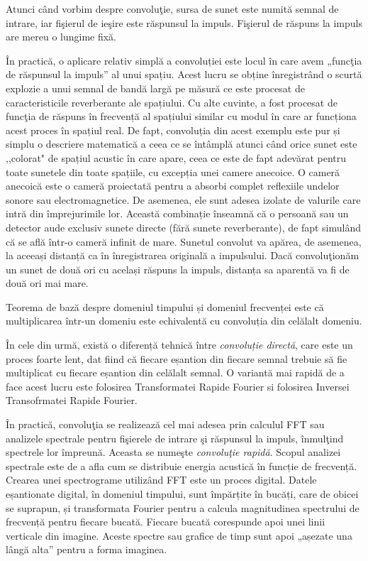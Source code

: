 	
	Atunci c\^{a}nd vorbim despre convolu\c{t}ie, sursa de sunet este numit\u{a} semnal de intrare, iar fi\c{s}ierul de ie\c{s}ire este r\u{a}spunsul la impuls. Fi\c{s}ierul de r\u{a}spuns la impuls are mereu o lungime fix\u{a}.
	 
	
	În practică, o aplicare relativ simplă a convoluției este locul în care avem „func\c{t}ia de răspunsul la impuls” al unui spațiu. Acest lucru se obține înregistrând o scurtă explozie a unui semnal de bandă largă pe măsură ce este procesat de caracteristicile reverberante ale spațiului. Cu alte cuvinte, a fost procesat de func\c{t}ia de răspuns în frecvență al spațiului similar cu modul în care ar funcționa acest proces în spațiul real. De fapt, convoluția din acest exemplu este pur și simplu o descriere matematică a ceea ce se întâmplă atunci când orice sunet este ,,colorat" de spațiul acustic în care apare, ceea ce este de fapt adevărat pentru toate sunetele din toate spațiile, cu excepția unei camere anecoice. O cameră anecoică este o cameră proiectată pentru a absorbi complet reflexiile undelor sonore sau electromagnetice. De asemenea, ele sunt adesea izolate de valurile care intră din împrejurimile lor. Această combinație înseamnă că o persoană sau un detector aude exclusiv sunete directe (fără sunete reverberante), de fapt simulând că se află într-o cameră infinit de mare. Sunetul convolut va apărea, de asemenea, la aceeași distanță ca în înregistrarea originală a impulsului. Dacă convolu\c{t}ion\u{a}m un sunet de două ori cu același răspuns la impuls, distanța sa aparentă va fi de două ori mai mare.
	 
	
	Teorema de bază despre domeniul timpului și domeniul frecvenței este că multiplicarea într-un domeniu este echivalentă cu convoluția din celălalt domeniu.
	 
	
	În cele din urmă, există o diferență tehnică între \textit{convoluție directă}, care este un proces foarte lent, dat fiind că fiecare eșantion din fiecare semnal trebuie să fie multiplicat cu fiecare eșantion din celălalt semnal. O variant\u{a} mai rapid\u{a} de a face acest lucru este folosirea Transformatei Rapide Fourier si folosirea Inversei Transofrmatei Rapide Fourier.
	 
	
	\^{I}n practic\u{a}, convolu\c{t}ia se realizeaz\u{a} cel mai adesea prin calculul FFT sau analizele spectrale pentru fi\c{s}ierele de intrare \c{s}i r\u{a}spunsul la impuls, \^{i}nmul\c{t}ind spectrele lor \^{i}mpreun\u{a}. Aceasta se nume\c{s}te  \textit{convolu\c{t}ie rapid\u{a}}. Scopul analizei spectrale este de a afla cum se distribuie energia acustică în funcție de frecvență. Crearea unei spectrograme utilizând FFT este un proces digital. Datele eșantionate digital, în domeniul timpului, sunt împărțite în bucăți, care de obicei se suprapun, și transformata Fourier pentru a calcula magnitudinea spectrului de frecvență pentru fiecare bucată. Fiecare bucată corespunde apoi unei linii verticale din imagine. Aceste spectre sau grafice de timp sunt apoi „așezate una lângă alta” pentru a forma imaginea.
	
